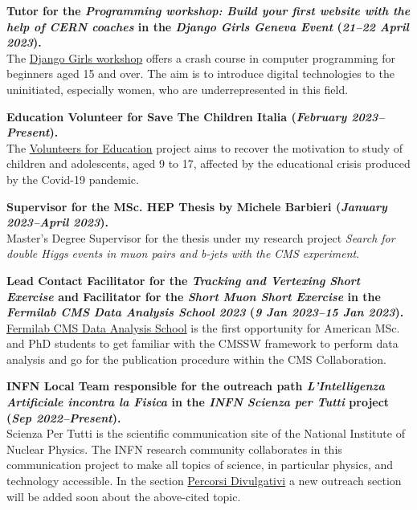 \documentclass[11pt]{res}
\begin{document}
\begin{resume}
\textbf{Tutor for the \textit{Programming workshop: Build your first website with the help of CERN coaches} in the \textit{Django Girls Geneva Event} (\textit{21--22 April 2023}).}\\
The \href{https://djangogirls.org/en/geneva_en/}{Django Girls workshop} offers a crash course in computer programming for beginners aged 15 and over. The aim is to introduce digital technologies to the uninitiated, especially women, who are underrepresented in this field.

\textbf{Education Volunteer for Save The Children Italia (\textit{February 2023--Present}).}\\
The \href{https://www.savethechildren.it/partecipa/volontari/volontari-per-educazione}{Volunteers for Education} project aims to recover the motivation to study of children and adolescents, aged 9 to 17, affected by the educational crisis produced by the Covid-19 pandemic.

\textbf{Supervisor for the MSc. HEP Thesis by Michele Barbieri (\textit{January 2023--April 2023}).}\\
Master's Degree Supervisor for the thesis under my research project \textit{Search for double Higgs events in muon pairs and b-jets with the CMS experiment}.

\textbf{Lead Contact Facilitator for the \textit{Tracking and Vertexing Short Exercise} and Facilitator for the \textit{Short Muon Short Exercise} in the \textit{Fermilab CMS Data Analysis School 2023} (\textit{9 Jan 2023--15 Jan 2023}).}\\
\href{https://indico.cern.ch/event/1213827/}{Fermilab CMS Data Analysis School} is the first opportunity for American MSc. and PhD students to get familiar with the CMSSW framework to perform data analysis and go for the publication procedure within the CMS Collaboration.

\textbf{INFN Local Team responsible for the outreach path \textit{L'Intelligenza Artificiale incontra la Fisica} in the \textit{INFN Scienza per Tutti} project (\textit{Sep 2022--Present}).}\\
Scienza Per Tutti is the scientific communication site of the National Institute of Nuclear Physics. The INFN research community collaborates in this communication project to make all topics of science, in particular physics, and technology accessible. In the section \href{https://scienzapertutti.infn.it/percorsi-divulgativi}{Percorsi Divulgativi} a new outreach section will be added soon about the above-cited topic.


\end{resume}
\end{document}
